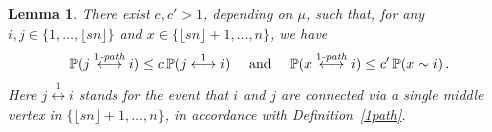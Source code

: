 \documentclass[12pt,a4paper]{article}
\numberwithin{equation}{section}
\newtheorem{lemma}[shared]{Lemma}
\begin{document}
\begin{lemma}\label{1con}
    There exist $c, c'>1$, depending on $\mu$, such that, for any $i,j\in\{1,\dots,\lfloor sn\rfloor\}$ and $x\in\{\lfloor sn\rfloor+1,\dots,n\}$, we have
    \begin{align*}
        \mathbb P(j\overset{1\text{\emph{-path}}}{\longleftrightarrow}i) \le c \,\mathbb P(j\overset{1}{\longleftrightarrow}i)\quad\text{ and }\quad\mathbb P(x\overset{1\text{\emph{-path}}}{\longleftrightarrow}i) \le c' \,\mathbb P(x\sim i)\,.
    \end{align*}
    Here %
    $j\overset{1}{\longleftrightarrow}i$ stands for the event that $i$ and $j$ are connected via a single middle vertex in $\{\lfloor sn\rfloor+1,\dots,n\}$, in accordance with Definition~\ref{1path}. 
\end{lemma}
\end{document}
